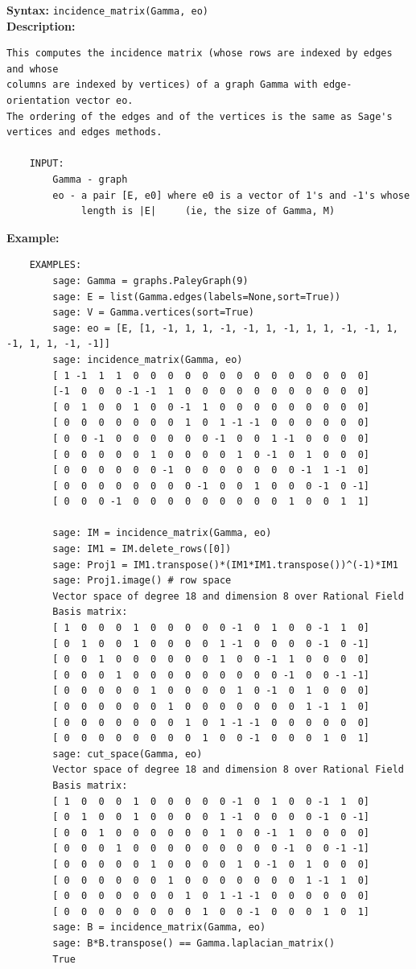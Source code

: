 \documentclass{article}
\begin{document}
\textbf{Syntax:} \verb}incidence_matrix(Gamma, eo)}\\

\textbf{Description:}
\begin{verbatim}
This computes the incidence matrix (whose rows are indexed by edges and whose
columns are indexed by vertices) of a graph Gamma with edge-orientation vector eo.
The ordering of the edges and of the vertices is the same as Sage's vertices and edges methods.

    INPUT:
        Gamma - graph
        eo - a pair [E, e0] where e0 is a vector of 1's and -1's whose 
             length is |E|     (ie, the size of Gamma, M)
\end{verbatim}

\textbf{Example:}
\begin{verbatim}
    EXAMPLES:
        sage: Gamma = graphs.PaleyGraph(9)
        sage: E = list(Gamma.edges(labels=None,sort=True))
        sage: V = Gamma.vertices(sort=True)
        sage: eo = [E, [1, -1, 1, 1, -1, -1, 1, -1, 1, 1, -1, -1, 1, -1, 1, 1, -1, -1]]
        sage: incidence_matrix(Gamma, eo)
        [ 1 -1  1  1  0  0  0  0  0  0  0  0  0  0  0  0  0  0]
        [-1  0  0  0 -1 -1  1  0  0  0  0  0  0  0  0  0  0  0]
        [ 0  1  0  0  1  0  0 -1  1  0  0  0  0  0  0  0  0  0]
        [ 0  0  0  0  0  0  0  1  0  1 -1 -1  0  0  0  0  0  0]
        [ 0  0 -1  0  0  0  0  0  0 -1  0  0  1 -1  0  0  0  0]
        [ 0  0  0  0  0  1  0  0  0  0  1  0 -1  0  1  0  0  0]
        [ 0  0  0  0  0  0 -1  0  0  0  0  0  0  0 -1  1 -1  0]
        [ 0  0  0  0  0  0  0  0 -1  0  0  1  0  0  0 -1  0 -1]
        [ 0  0  0 -1  0  0  0  0  0  0  0  0  0  1  0  0  1  1]

        sage: IM = incidence_matrix(Gamma, eo)
        sage: IM1 = IM.delete_rows([0])
        sage: Proj1 = IM1.transpose()*(IM1*IM1.transpose())^(-1)*IM1
        sage: Proj1.image() # row space
        Vector space of degree 18 and dimension 8 over Rational Field
        Basis matrix:
        [ 1  0  0  0  1  0  0  0  0  0 -1  0  1  0  0 -1  1  0]
        [ 0  1  0  0  1  0  0  0  0  1 -1  0  0  0  0 -1  0 -1]
        [ 0  0  1  0  0  0  0  0  0  1  0  0 -1  1  0  0  0  0]
        [ 0  0  0  1  0  0  0  0  0  0  0  0  0 -1  0  0 -1 -1]
        [ 0  0  0  0  0  1  0  0  0  0  1  0 -1  0  1  0  0  0]
        [ 0  0  0  0  0  0  1  0  0  0  0  0  0  0  1 -1  1  0]
        [ 0  0  0  0  0  0  0  1  0  1 -1 -1  0  0  0  0  0  0]
        [ 0  0  0  0  0  0  0  0  1  0  0 -1  0  0  0  1  0  1]
        sage: cut_space(Gamma, eo)
        Vector space of degree 18 and dimension 8 over Rational Field
        Basis matrix:
        [ 1  0  0  0  1  0  0  0  0  0 -1  0  1  0  0 -1  1  0]
        [ 0  1  0  0  1  0  0  0  0  1 -1  0  0  0  0 -1  0 -1]
        [ 0  0  1  0  0  0  0  0  0  1  0  0 -1  1  0  0  0  0]
        [ 0  0  0  1  0  0  0  0  0  0  0  0  0 -1  0  0 -1 -1]
        [ 0  0  0  0  0  1  0  0  0  0  1  0 -1  0  1  0  0  0]
        [ 0  0  0  0  0  0  1  0  0  0  0  0  0  0  1 -1  1  0]
        [ 0  0  0  0  0  0  0  1  0  1 -1 -1  0  0  0  0  0  0]
        [ 0  0  0  0  0  0  0  0  1  0  0 -1  0  0  0  1  0  1]
        sage: B = incidence_matrix(Gamma, eo) 
        sage: B*B.transpose() == Gamma.laplacian_matrix()
        True


\end{verbatim}
\end{document}
